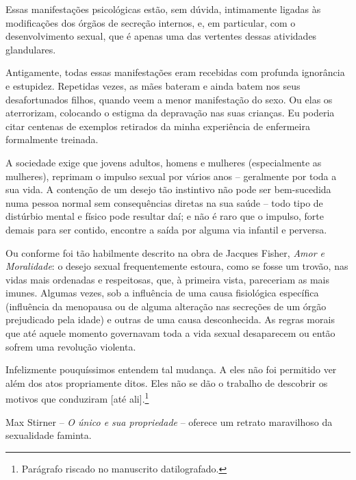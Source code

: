 Essas manifestações psicológicas estão, sem dúvida, intimamente ligadas
às modificações dos órgãos de secreção internos, e, em particular, com o
desenvolvimento sexual, que é apenas uma das vertentes dessas atividades
glandulares.

Antigamente, todas essas manifestações eram recebidas com profunda
ignorância e estupidez. Repetidas vezes, as mães bateram e ainda batem
nos seus desafortunados filhos, quando veem a menor manifestação do
sexo. Ou elas os aterrorizam, colocando o estigma da depravação nas suas
crianças. Eu poderia citar centenas de exemplos retirados da minha
experiência de enfermeira formalmente treinada.

A sociedade exige que jovens adultos, homens e mulheres (especialmente
as mulheres), reprimam o impulso sexual por vários anos -- geralmente
por toda a sua vida. A contenção de um desejo tão instintivo não pode
ser bem-sucedida numa pessoa normal sem consequências diretas na sua
saúde -- todo tipo de distúrbio mental e físico pode resultar daí; e não
é raro que o impulso, forte demais para ser contido, encontre a saída
por alguma via infantil e perversa.

\asterisc

Ou conforme foi tão habilmente descrito na obra de Jacques Fisher,
\emph{Amor e Moralidade}: o desejo sexual frequentemente estoura, como
se fosse um trovão, nas vidas mais ordenadas e respeitosas, que, à
primeira vista, pareceriam as mais imunes. Algumas vezes, sob a
influência de uma causa fisiológica específica (influência da menopausa
ou de alguma alteração nas secreções de um órgão prejudicado pela idade)
e outras de uma causa desconhecida. As regras morais que até aquele
momento governavam toda a vida sexual desaparecem ou então sofrem uma
revolução violenta.

Infelizmente pouquíssimos entendem tal mudança. A eles não foi permitido
ver além dos atos propriamente ditos. Eles não se dão o trabalho de
descobrir os motivos que conduziram {[}até ali{]}.\footnote{Parágrafo
  riscado no manuscrito datilografado.}

\asterisc

Max Stirner -- \emph{O único e sua propriedade} -- oferece um retrato
maravilhoso da sexualidade faminta.

